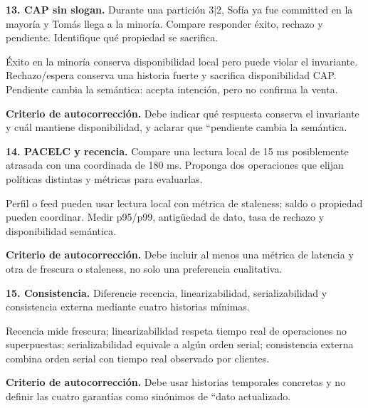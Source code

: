 \documentclass[variant=guiaresuelta,cover=institutional,mode=screen]{ua-engineering-v6-article}
\begin{document}
\begin{uaexercise}
\textbf{13. CAP sin slogan.} Durante una partición 3|2, Sofía ya fue committed en la mayoría y Tomás llega a la minoría. Compare responder éxito, rechazo y pendiente. Identifique qué propiedad se sacrifica.
\end{uaexercise}
\begin{uaanswer}
Éxito en la minoría conserva disponibilidad local pero puede violar el invariante. Rechazo/espera conserva una historia fuerte y sacrifica disponibilidad CAP. Pendiente cambia la semántica: acepta intención, pero no confirma la venta.

\par\smallskip\textbf{Criterio de autocorrección.} Debe indicar qué respuesta conserva el invariante y cuál mantiene disponibilidad, y aclarar que ``pendiente cambia la semántica.
\end{uaanswer}

\begin{uaexercise}
\textbf{14. PACELC y recencia.} Compare una lectura local de 15 ms posiblemente atrasada con una coordinada de 180 ms. Proponga dos operaciones que elijan políticas distintas y métricas para evaluarlas.
\end{uaexercise}
\begin{uaanswer}
Perfil o feed pueden usar lectura local con métrica de staleness; saldo o propiedad pueden coordinar. Medir p95/p99, antigüedad de dato, tasa de rechazo y disponibilidad semántica.

\par\smallskip\textbf{Criterio de autocorrección.} Debe incluir al menos una métrica de latencia y otra de frescura o staleness, no solo una preferencia cualitativa.
\end{uaanswer}

\begin{uaexercise}
\textbf{15. Consistencia.} Diferencie recencia, linearizabilidad, serializabilidad y consistencia externa mediante cuatro historias mínimas.
\end{uaexercise}
\begin{uaanswer}
Recencia mide frescura; linearizabilidad respeta tiempo real de operaciones no superpuestas; serializabilidad equivale a algún orden serial; consistencia externa combina orden serial con tiempo real observado por clientes.

\par\smallskip\textbf{Criterio de autocorrección.} Debe usar historias temporales concretas y no definir las cuatro garantías como sinónimos de ``dato actualizado.
\end{uaanswer}
\end{document}

